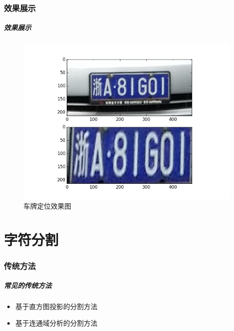 \documentclass[UTF8]{beamer}
\begin{document}
\section{效果展示}

\begin{frame}
  \frametitle{效果展示}

  \begin{figure}[ht]
    \centering
    \includegraphics[height=0.6\textheight]{./Figure/LocalizationDemo.png}
    \caption{车牌定位效果图}\label{Fig:LocalizationDemo}
  \end{figure}
\end{frame}

\part{字符分割}

\section{传统方法}

\begin{frame}
  \frametitle{常见的传统方法}
  
  \begin{itemize}
    \item 基于直方图投影的分割方法
    \item 基于连通域分析的分割方法
  \end{itemize}
\end{frame}
\end{document}
